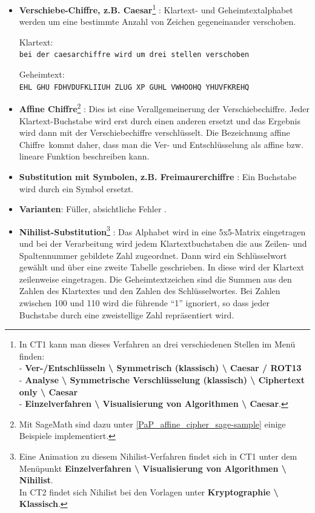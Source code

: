 \begin{refsegment}
\begin{itemize}
\item \textbf{Verschiebe-Chiffre, z.B. Caesar}\footnote{In CT1
   kann man dieses Verfahren an drei verschiedenen Stellen im Menü finden:\\
   - \textbf{Ver-/Entschlüsseln \textbackslash{} Symmetrisch (klassisch)
     \textbackslash{} Caesar / ROT13} \\
   - \textbf{Analyse \textbackslash{} Symmetrische Verschlüsselung (klassisch)
     \textbackslash{} Ciphertext only \textbackslash{} Caesar} \\
   - \textbf{Einzelverfahren \textbackslash{} Visualisierung von Algorithmen
     \textbackslash{} Caesar}.
   }
   \cite{Singh2001}%
   : Klartext- und Geheimtextalphabet werden um eine bestimmte Anzahl von
   Zeichen gegeneinander verschoben.

   Klartext:\\ 	\texttt{bei der caesarchiffre wird um drei stellen verschoben}

   Geheimtext:\\ \texttt{EHL GHU FDHVDUFKLIIUH ZLUG XP GUHL VWHOOHQ YHUVFKREHQ}


\item \textbf{Affine Chiffre}\footnote{
   Mit SageMath sind dazu unter \ref{PaP_affine_cipher_sage-sample} einige Beispiele
   implementiert.}%
   : Dies ist eine Verallgemeinerung
   der Verschiebechiffre. Jeder Klartext-Buchstabe wird erst durch einen anderen
   ersetzt und das Ergebnis wird dann mit der Verschiebechiffre verschlüsselt.
   Die Bezeichnung \glqq affine Chiffre\grqq~kommt daher, dass man die
   Ver- und Entschlüsselung als affine bzw. lineare Funktion beschreiben kann.


\item \textbf{Substitution mit Symbolen, z.B. Freimaurerchiffre}
   \cite{Singh2001}: Ein Buchstabe wird durch ein Symbol ersetzt.

\item \textbf{Varianten}: Füller, absichtliche Fehler \cite{Singh2001}.

\item \textbf{Nihilist-Substitution}\footnote{Eine Animation zu diesem
   Nihilist-Verfahren findet sich in CT1 unter dem Menüpunkt
     \textbf{Einzelverfahren \textbackslash{} Visualisierung von Algorithmen
     \textbackslash{} Nihilist}.\\
     In CT2 findet sich Nihilist bei den Vorlagen unter
     \textbf{Kryptographie \textbackslash{} Klassisch}.
   }
   \cite{ACA2002}: Das Alphabet wird in
   eine 5x5-Matrix eingetragen und bei der Verarbeitung wird jedem Klartextbuchstaben
   die aus Zeilen- und Spaltennummer gebildete Zahl zugeordnet.
   Dann wird ein Schlüsselwort gewählt und über eine zweite Tabelle geschrieben.
   In diese wird der Klartext zeilenweise eingetragen.
   Die Geheimtextzeichen sind die Summen aus den
   Zahlen des Klartextes und den Zahlen des Schlüsselwortes. Bei Zahlen
   zwischen 100 und 110 wird die führende "`1"' ignoriert, so dass jeder
   Buchstabe durch eine zweistellige Zahl repräsentiert wird.


\end{itemize}
\end{refsegment}
